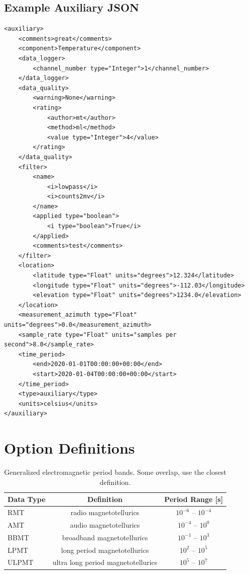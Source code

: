 \documentclass[12pt]{article}
\begin{document}
\newpage
\subsection{Example Auxiliary JSON} 

\begin{verbatim}
<auxiliary>
    <comments>great</comments>
    <component>Temperature</component>
    <data_logger>
        <channel_number type="Integer">1</channel_number>
    </data_logger>
    <data_quality>
        <warning>None</warning>
        <rating>
            <author>mt</author>
            <method>ml</method>
            <value type="Integer">4</value>
        </rating>
    </data_quality>
    <filter>
        <name>
            <i>lowpass</i>
            <i>counts2mv</i>
        </name>
        <applied type="boolean">
            <i type="boolean">True</i>
        </applied>
        <comments>test</comments>
    </filter>
    <location>
        <latitude type="Float" units="degrees">12.324</latitude>
        <longitude type="Float" units="degrees">-112.03</longitude>
        <elevation type="Float" units="degrees">1234.0</elevation>
    </location>
    <measurement_azimuth type="Float" units="degrees">0.0</measurement_azimuth>
    <sample_rate type="Float" units="samples per second">8.0</sample_rate>
    <time_period>
        <end>2020-01-01T00:00:00+00:00</end>
        <start>2020-01-04T00:00:00+00:00</start>
    </time_period>
    <type>auxiliary</type>
    <units>celsius</units>
</auxiliary>
\end{verbatim}

\newpage
\appendix
\section{Option Definitions}
\label{appendix}

\begin{table}[h!]
	\centering
	\caption[Electromagnetic Period Bands]{Generalized electromagnetic period bands.  Some overlap, use the closest definition.}
	\begin{tabular}{lcc}
		\toprule
		\textbf{Data Type} & \textbf{Definition}  & \textbf{Period Range [s]} \\ \midrule
		RMT & radio magnetotellurics &  $10^{-6}$ -- $10^{-4}$\\ \midrule	
		AMT &  audio magnetotellurics & $10^{-4}$ -- $10^{0}$ \\ \midrule
		BBMT & broadband magnetotellurics & $10^{-1}$ -- $10^{3}$ \\ \midrule
		LPMT & long period magnetotellurics  &  $10^{2}$ -- $10^{5}$ \\ \midrule
		ULPMT & ultra long period magnetotellurics  &  $10^{5}$ -- $10^{7}$ \\ \bottomrule		
	\end{tabular}
	\label{tab:em}
\end{table}
\end{document}
